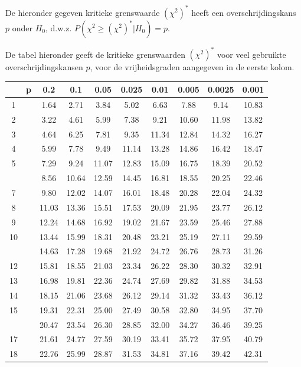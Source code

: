 \documentclass[
]{book}
\begin{document}
De hieronder gegeven kritieke grenswaarde \((\chi^2)^*\) heeft een overschrijdingskans \(p\)
onder \(H_0\), d.w.z. \(P(\chi^2 \geq (\chi^2)^*|H_0)=p\).

De tabel hieronder geeft de kritieke grenswaarden \((\chi^2)^*\) voor veel gebruikte overschrijdingskansen \(p\), voor de vrijheidsgraden aangegeven in de eerste kolom.

\begin{tabular}{cccccccccc}
\toprule
 & p & 0.2 & 0.1 & 0.05 & 0.025 & 0.01 & 0.005 & 0.0025 & 0.001\\
\midrule
1 &  & 1.64 & 2.71 & 3.84 & 5.02 & 6.63 & 7.88 & 9.14 & 10.83\\
2 &  & 3.22 & 4.61 & 5.99 & 7.38 & 9.21 & 10.60 & 11.98 & 13.82\\
3 &  & 4.64 & 6.25 & 7.81 & 9.35 & 11.34 & 12.84 & 14.32 & 16.27\\
4 &  & 5.99 & 7.78 & 9.49 & 11.14 & 13.28 & 14.86 & 16.42 & 18.47\\
5 &  & 7.29 & 9.24 & 11.07 & 12.83 & 15.09 & 16.75 & 18.39 & 20.52\\
\addlinespace
6 &  & 8.56 & 10.64 & 12.59 & 14.45 & 16.81 & 18.55 & 20.25 & 22.46\\
7 &  & 9.80 & 12.02 & 14.07 & 16.01 & 18.48 & 20.28 & 22.04 & 24.32\\
8 &  & 11.03 & 13.36 & 15.51 & 17.53 & 20.09 & 21.95 & 23.77 & 26.12\\
9 &  & 12.24 & 14.68 & 16.92 & 19.02 & 21.67 & 23.59 & 25.46 & 27.88\\
10 &  & 13.44 & 15.99 & 18.31 & 20.48 & 23.21 & 25.19 & 27.11 & 29.59\\
\addlinespace
11 &  & 14.63 & 17.28 & 19.68 & 21.92 & 24.72 & 26.76 & 28.73 & 31.26\\
12 &  & 15.81 & 18.55 & 21.03 & 23.34 & 26.22 & 28.30 & 30.32 & 32.91\\
13 &  & 16.98 & 19.81 & 22.36 & 24.74 & 27.69 & 29.82 & 31.88 & 34.53\\
14 &  & 18.15 & 21.06 & 23.68 & 26.12 & 29.14 & 31.32 & 33.43 & 36.12\\
15 &  & 19.31 & 22.31 & 25.00 & 27.49 & 30.58 & 32.80 & 34.95 & 37.70\\
\addlinespace
16 &  & 20.47 & 23.54 & 26.30 & 28.85 & 32.00 & 34.27 & 36.46 & 39.25\\
17 &  & 21.61 & 24.77 & 27.59 & 30.19 & 33.41 & 35.72 & 37.95 & 40.79\\
18 &  & 22.76 & 25.99 & 28.87 & 31.53 & 34.81 & 37.16 & 39.42 & 42.31\\

\end{tabular}
\end{document}
